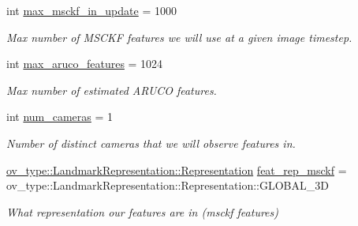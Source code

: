 \begin{DoxyCompactItemize}
\mbox{\label{structov__msckf_1_1StateOptions_a6fb28c6eb0838363eee0ce37a2828ed9}} 
int \hyperlink{structov__msckf_1_1StateOptions_a6fb28c6eb0838363eee0ce37a2828ed9}{max\+\_\+msckf\+\_\+in\+\_\+update} = 1000
\begin{DoxyCompactList}\small\item\em Max number of M\+S\+C\+KF features we will use at a given image timestep. \end{DoxyCompactList}\item 
\mbox{\label{structov__msckf_1_1StateOptions_ad26177fc751cdcf12e9e19ef698f91eb}} 
int \hyperlink{structov__msckf_1_1StateOptions_ad26177fc751cdcf12e9e19ef698f91eb}{max\+\_\+aruco\+\_\+features} = 1024
\begin{DoxyCompactList}\small\item\em Max number of estimated A\+R\+U\+CO features. \end{DoxyCompactList}\item 
\mbox{\label{structov__msckf_1_1StateOptions_a1de43b7611b68b3bbae742adfd0e20e5}} 
int \hyperlink{structov__msckf_1_1StateOptions_a1de43b7611b68b3bbae742adfd0e20e5}{num\+\_\+cameras} = 1
\begin{DoxyCompactList}\small\item\em Number of distinct cameras that we will observe features in. \end{DoxyCompactList}\item 
\mbox{\label{structov__msckf_1_1StateOptions_a385de6983ebba82af2215898610aed36}} 
\hyperlink{classov__type_1_1LandmarkRepresentation_a7f5783df6932ace7f098ae243b6d298e}{ov\+\_\+type\+::\+Landmark\+Representation\+::\+Representation} \hyperlink{structov__msckf_1_1StateOptions_a385de6983ebba82af2215898610aed36}{feat\+\_\+rep\+\_\+msckf} = ov\+\_\+type\+::\+Landmark\+Representation\+::\+Representation\+::\+G\+L\+O\+B\+A\+L\+\_\+3D
\begin{DoxyCompactList}\small\item\em What representation our features are in (msckf features) \end{DoxyCompactList}\item 
\mbox{\label{structov__msckf_1_1StateOptions_a426ea4e9c3f5f269eddb356e9e7feb6c}} 

\end{DoxyCompactItemize}
